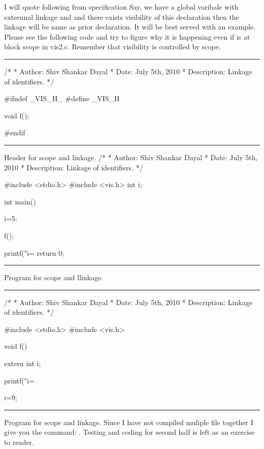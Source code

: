 I will quote following from specification 
Say, we have a global varibale with externnal linkage and and there
exists visibility of this declaration then the linkage will be same as
prior declaration. It will be best served with an example. Please see
the following code and try to figure why it is happening even if
 is at block scope in vis2.c. Remember that
visibility is controlled by scope.
\blank[force,1mm]\hrule\blank[force,1mm]
\startCPP
/*
 * Author: Shiv Shankar Dayal
 * Date: July 5th, 2010
 * Description: Linkage of identifiers.
 */

#ifndef _VIS_H_
#define _VIS_H

void f();

#endif
\stopCPP
{}
\hrule
\blank[force,1mm]
\startalignment[middle]
Header for scope and linkage.
\stopalignment
\startCPP
/*
 * Author: Shiv Shankar Dayal
 * Date: July 5th, 2010
 * Description: Linkage of identifiers.
 */

#include <stdio.h>
#include <vis.h>
int i;

int main()
{
  i=5;

  f();

  printf("i=%
  return 0;
}	
\stopCPP
{}
\hrule
\blank[force,1mm]
\startalignment[middle]
Program for scope and llinkage.
\stopalignment
\blank[force,1mm]\hrule\blank[force,1mm]
\startCPP
/*
 * Author: Shiv Shankar Dayal
 * Date: July 5th, 2010
 * Description: Linkage of identifiers.
 */

#include <stdio.h>
#include <vis.h>

void f()
{
  extern int i;

  printf("i=%
	
  i=9;
}\stopCPP
{}
\hrule
\blank[force,1mm]
\startalignment[middle]
Program for scope and linkage.
\stopalignment
Since I have not compiled muliple file together I give you the
command: . Testing
and coding for second half is left as an exercise to reader.

